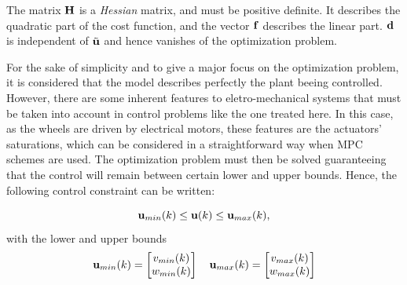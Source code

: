 \documentclass[conference]{IEEEtran} %
\begin{document}
The matrix ${\bf H}$ is a {\em Hessian} matrix, and must be positive definite. It describes the quadratic part of the cost function, and the vector ${\bf f}$ describes the linear part. $\bf d$ is independent of $\tilde{\bf u}$ and hence vanishes of the optimization problem.

For the sake of simplicity and to give a major focus on the optimization problem, it is considered that the model describes perfectly the plant beeing controlled. However, there are some inherent features to eletro-mechanical systems that must be taken into account in control problems like the one treated here. In this case, as the wheels are driven by electrical motors, these features are the actuators' saturations, which can be considered in a straightforward way when MPC schemes are used. The optimization problem must then be solved guaranteeing that the control will remain between certain lower and upper bounds. Hence, the following control constraint can be written:

\begin{equation}\label{eqn:uconstr}
	{\bf u}_{min}(k) \leq {\bf u}(k) \leq {\bf u}_{max}(k),
\end{equation}
with the lower and upper bounds 
\begin{equation*}
	{\bf u}_{min}(k) = \begin{bmatrix}
		v_{min}(k) \\ w_{min}(k)
	\end{bmatrix} \quad 
	{\bf u}_{max}(k) = \begin{bmatrix}
		v_{max}(k) \\ w_{max}(k)
	\end{bmatrix}
\end{equation*}
\end{document}

